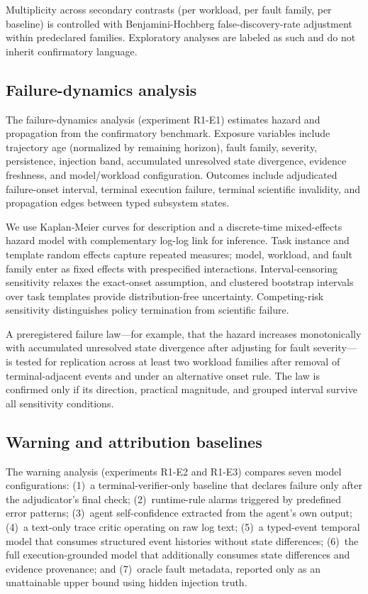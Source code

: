 Multiplicity across secondary contrasts (per workload, per fault family, per
baseline) is controlled with Benjamini-Hochberg false-discovery-rate
adjustment within predeclared families. Exploratory analyses are labeled as
such and do not inherit confirmatory language.

\subsection{Failure-dynamics analysis}
\label{sec:methods_failure_dynamics}

The failure-dynamics analysis (experiment R1-E1) estimates hazard and
propagation from the confirmatory benchmark. Exposure variables include
trajectory age (normalized by remaining horizon), fault family, severity,
persistence, injection band, accumulated unresolved state divergence,
evidence freshness, and model/workload configuration. Outcomes include
adjudicated failure-onset interval, terminal execution failure, terminal
scientific invalidity, and propagation edges between typed subsystem states.

We use Kaplan-Meier curves for description and a discrete-time mixed-effects
hazard model with complementary log-log link for inference. Task instance
and template random effects capture repeated measures; model, workload, and
fault family enter as fixed effects with prespecified interactions.
Interval-censoring sensitivity relaxes the exact-onset assumption, and
clustered bootstrap intervals over task templates provide distribution-free
uncertainty. Competing-risk sensitivity distinguishes policy termination
from scientific failure.

A preregistered failure law—for example, that the hazard increases
monotonically with accumulated unresolved state divergence after adjusting
for fault severity—is tested for replication across at least two workload
families after removal of terminal-adjacent events and under an alternative
onset rule. The law is confirmed only if its direction, practical magnitude,
and grouped interval survive all sensitivity conditions.

\subsection{Warning and attribution baselines}
\label{sec:methods_warning}

The warning analysis (experiments R1-E2 and R1-E3) compares seven model
configurations: (1)~a terminal-verifier-only baseline that declares failure
only after the adjudicator's final check; (2)~runtime-rule alarms triggered
by predefined error patterns; (3)~agent self-confidence extracted from the
agent's own output; (4)~a text-only trace critic operating on raw log text;
(5)~a typed-event temporal model that consumes structured event histories
without state differences; (6)~the full execution-grounded model that
additionally consumes state differences and evidence provenance; and
(7)~oracle fault metadata, reported only as an unattainable upper bound
using hidden injection truth.

